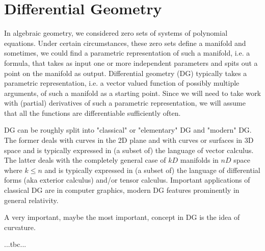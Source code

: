 \section{Differential Geometry}
In algebraic geometry, we considered zero sets of systems of polynomial equations. Under certain circumstances, these zero sets define a manifold and sometimes, we could find a parametric representation of such a manifold, i.e. a formula, that takes as input one or more independent parameters and spits out a point on the manifold as output. Differential geometry (DG) typically takes a parametric representation, i.e. a vector valued function of possibly multiple arguments, of such a manifold as a starting point. Since we will need to take work with (partial) derivatives of such a parametric representation, we will assume that all the functions are differentiable sufficiently often.

\medskip
DG can be roughly split into "classical" or "elementary" DG and "modern" DG. The former deals with curves in the 2D plane and with curves or surfaces in 3D space and is typically expressed in (a subset of) the language of vector calculus. The latter deals with the completely general case of $kD$ manifolds in $nD$ space where $k \leq n$ and is typically expressed in (a subset of) the language of differential forms (aka exterior calculus) and/or tensor calculus. Important applications of classical DG are in computer graphics, modern DG features prominently in general relativity.

\medskip
A very important, maybe the most important, concept in DG is the idea of curvature.


...tbc...



